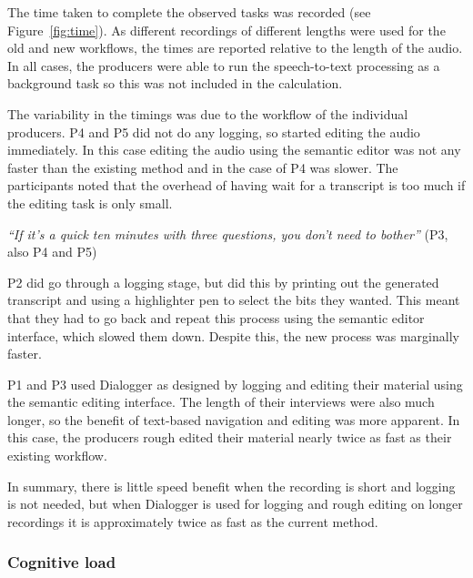 The time taken to complete the observed tasks was recorded (see Figure~\ref{fig:time}). As different recordings of
different lengths were used for the old and new workflows, the times are reported relative to the length of the audio.
In all cases, the producers were able to run the speech-to-text processing as a background task so this was not
included in the calculation.

The variability in the timings was due to the workflow of the individual producers. P4 and P5 did not do any logging,
so started editing the audio immediately. In this case editing the audio using the semantic editor was not any faster
than the existing method and in the case of P4 was slower.  The participants noted that the overhead of having wait for
a transcript is too much if the editing task is only small.

\textit{``If it's a quick ten minutes with three questions, you don't need to bother''} (P3, also P4 and P5)

P2 did go through a logging stage, but did this by printing out the generated transcript and using a highlighter pen to
select the bits they wanted. This meant that they had to go back and repeat this process using the semantic editor
interface, which slowed them down. Despite this, the new process was marginally faster.

P1 and P3 used Dialogger as designed by logging and editing their material using the semantic editing interface. The
length of their interviews were also much longer, so the benefit of text-based navigation and editing was more
apparent. In this case, the producers rough edited their material nearly twice as fast as their existing workflow.

In summary, there is little speed benefit when the recording is short and logging is not needed, but when Dialogger is
used for logging and rough editing on longer recordings it is approximately twice as fast as the current method.

\subsubsection{Cognitive load}



